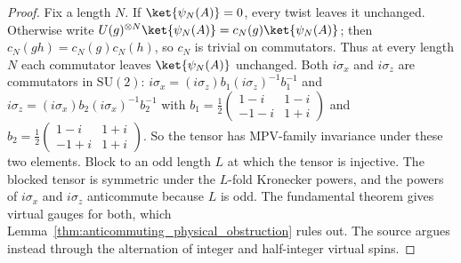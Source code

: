 \begin{proof}\leanok
    Fix a length $N$.  If $\ket{\psi_N(A)}=0$, every twist leaves it
    unchanged.  Otherwise write
    $U(g)^{\otimes N}\ket{\psi_N(A)}=c_N(g)\ket{\psi_N(A)}$; then
    $c_N(gh)=c_N(g)c_N(h)$, so $c_N$ is trivial on commutators.  Thus at every
    length $N$ each commutator leaves $\ket{\psi_N(A)}$ unchanged.  Both $i\sigma_x$ and
    $i\sigma_z$ are commutators in $\mathrm{SU}(2)$:
    $i\sigma_x=(i\sigma_z)b_1(i\sigma_z)^{-1}b_1^{-1}$ and
    $i\sigma_z=(i\sigma_x)b_2(i\sigma_x)^{-1}b_2^{-1}$ with
    $b_1=\tfrac12\begin{pmatrix}1-i&1-i\\-1-i&1+i\end{pmatrix}$ and
    $b_2=\tfrac12\begin{pmatrix}1-i&1+i\\-1+i&1+i\end{pmatrix}$.  So the
    tensor has MPV-family invariance under these two elements.
    Block to an odd length $L$ at which the tensor is injective.  The blocked tensor
    is symmetric under the $L$-fold Kronecker powers, and the powers of
    $i\sigma_x$ and $i\sigma_z$ anticommute because $L$ is odd.  The fundamental
    theorem gives virtual gauges for both, which
    Lemma~\ref{thm:anticommuting_physical_obstruction} rules out.  The source
    argues instead through the alternation of integer and half-integer virtual
    spins.
\end{proof}

